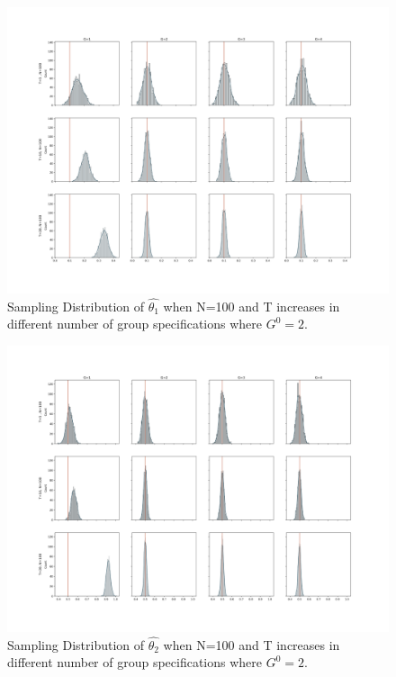 \begin{figure}[h]
\begin{flushleft}
\includegraphics[scale=0.31]{sections/appendix/groupssamplingplotT1.png}
\end{flushleft}
\caption{Sampling Distribution of $\hat{\theta_1}$ when N=100 and T increases in different number of group specifications where $G^0 = 2$.}
\label{fig:gsn}
\end{figure}

\begin{figure}[h]
\begin{flushleft}
\includegraphics[scale=0.31]{sections/appendix/groupssamplingplotT.png}
\end{flushleft}
\caption{Sampling Distribution of $\hat{\theta_2}$ when N=100 and T increases in different number of group specifications where $G^0 = 2$.}
\label{fig:gsn}
\end{figure}



